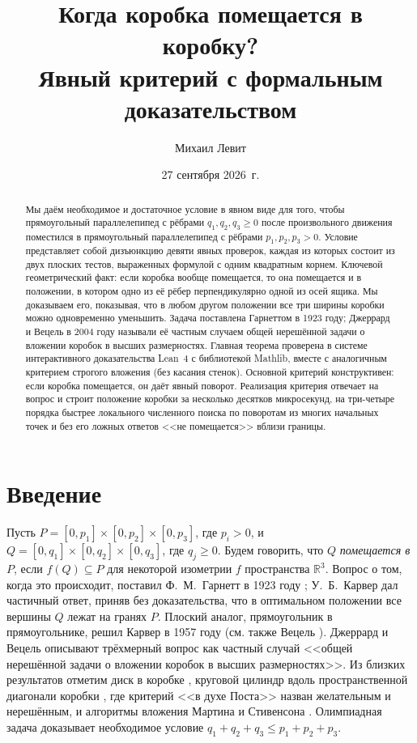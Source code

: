 \documentclass[11pt]{article}
\title{Когда коробка помещается в коробку?\\ Явный критерий с формальным доказательством}
\author{Михаил Левит}
\date{27 сентября 2026~г.}
\theoremstyle{definition}
\theoremstyle{remark}
\newcommand{\R}{\mathbb{R}}
\begin{document}
\maketitle

\begin{abstract}
Мы даём необходимое и достаточное условие в явном виде для того, чтобы прямоугольный параллелепипед
с рёбрами $q_1,q_2,q_3\ge 0$ после произвольного движения поместился в прямоугольный параллелепипед
с рёбрами $p_1,p_2,p_3>0$. Условие представляет собой дизъюнкцию девяти явных проверок, каждая из
которых состоит из двух плоских тестов, выраженных формулой с одним квадратным корнем. Ключевой
геометрический факт: если коробка вообще помещается, то она помещается и в положении, в котором одно
из её рёбер перпендикулярно одной из осей ящика. Мы доказываем его, показывая, что в любом другом
положении все три ширины коробки можно одновременно уменьшить. Задача поставлена Гарнеттом в 1923
году; Джеррард и Вецель в 2004 году называли её частным случаем общей нерешённой задачи о вложении коробок в высших размерностях. Главная теорема проверена в системе
интерактивного доказательства Lean~4 с библиотекой Mathlib, вместе с аналогичным критерием строгого
вложения (без касания стенок).
Основной критерий конструктивен: если коробка помещается, он даёт явный поворот. Реализация критерия
отвечает на вопрос и строит положение коробки за несколько десятков микросекунд, на три-четыре порядка
быстрее локального численного поиска по поворотам из многих начальных точек и без его ложных
ответов <<не помещается>> вблизи границы.
\end{abstract}

\section{Введение}

Пусть $P=[0,p_1]\times[0,p_2]\times[0,p_3]$, где $p_i>0$, и $Q=[0,q_1]\times[0,q_2]\times[0,q_3]$,
где $q_j\ge 0$. Будем говорить, что $Q$ \emph{помещается в} $P$, если $f(Q)\subseteq P$ для
некоторой изометрии $f$ пространства $\R^3$. Вопрос о том, когда это происходит, поставил
Ф.~М.~Гарнетт в 1923 году \cite{Garnett1923}; У.~Б.~Карвер \cite{Carver1925} дал частичный ответ,
приняв без доказательства, что в оптимальном положении все вершины $Q$ лежат на гранях $P$. Плоский
аналог, прямоугольник в прямоугольнике, решил Карвер в 1957 году \cite{Carver1957} (см. также Вецель
\cite{Wetzel2000}). Джеррард и Вецель \cite[с.~22]{JerrardWetzel2004} описывают трёхмерный вопрос как
частный случай <<общей нерешённой задачи о вложении коробок в высших размерностях>>. Из близких
результатов отметим диск в коробке \cite{AlexanderWetzel2005}, круговой цилиндр вдоль пространственной
диагонали коробки \cite{JSSW2006}, где критерий <<в духе Поста>> \cite{Post1993} назван желательным и
нерешённым, и алгоритмы вложения Мартина и Стивенсона \cite{MartinStephenson1989}. Олимпиадная задача
\cite{Kvant1999} доказывает необходимое условие $q_1+q_2+q_3\le p_1+p_2+p_3$.
\end{document}
